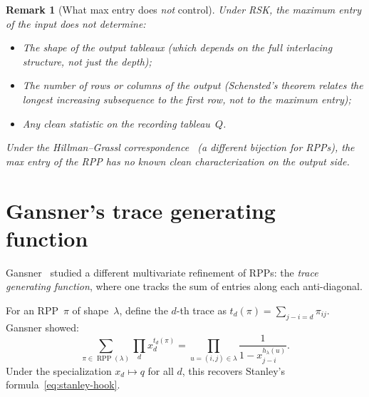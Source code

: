 \documentclass[11pt]{article}
\newtheorem{remark}[theorem]{Remark}
\newcommand{\RPP}{\operatorname{RPP}}
\begin{document}
\begin{remark}[What max entry does \emph{not} control]
Under RSK, the maximum entry of the input does \emph{not}
determine:
\begin{itemize}
  \item The shape of the output tableaux (which depends on
    the full interlacing structure, not just the depth);
  \item The number of rows or columns of the output
    (Schensted's theorem relates the longest increasing
    subsequence to the first row, not to the maximum entry);
  \item Any clean statistic on the \emph{recording}
    tableau~$Q$.
\end{itemize}
Under the Hillman--Grassl correspondence~\cite{hillman-grassl}
(a different bijection for RPPs), the max entry of the RPP
has no known clean characterization on the output side.
\end{remark}

\section{Gansner's trace generating function}
\label{sec:gansner}

Gansner~\cite{gansner-1981} studied a different multivariate
refinement of RPPs: the \emph{trace generating function},
where one tracks the sum of entries along each anti-diagonal.

For an RPP~$\pi$ of shape~$\lambda$, define the $d$-th trace as
$t_d(\pi) = \sum_{j-i=d} \pi_{ij}$. Gansner showed:
\begin{equation}\label{eq:gansner}
  \sum_{\pi \in \RPP(\lambda)}
  \prod_{d} x_d^{t_d(\pi)}
  = \prod_{u = (i,j) \in \lambda}
  \frac{1}{1 - x_{j-i}^{h_\lambda(u)}}.
\end{equation}
Under the specialization $x_d \mapsto q$ for all $d$,
this recovers Stanley's formula~\eqref{eq:stanley-hook}.
\end{document}
